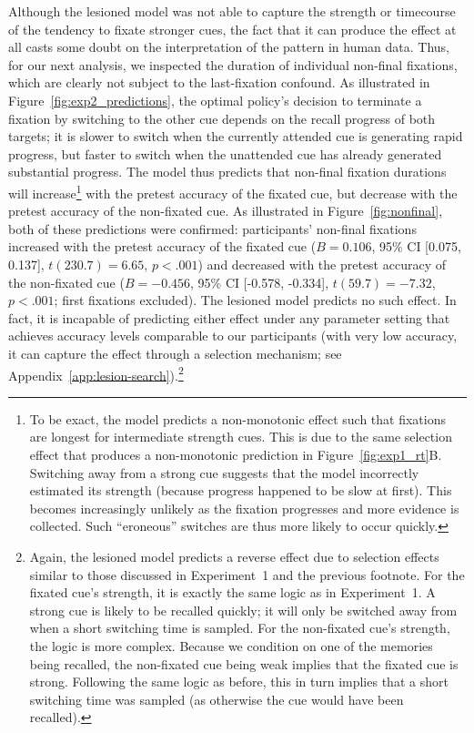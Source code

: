 Although the lesioned model was not able to capture the strength or timecourse of the tendency to fixate stronger cues, the fact that it can produce the effect at all casts some doubt on the interpretation of the pattern in human data. Thus, for our next analysis, we inspected the duration of individual non-final fixations, which are clearly not subject to the last-fixation confound. As illustrated in Figure~\ref{fig:exp2_predictions}, the optimal policy's decision to terminate a fixation by switching to the other cue depends on the recall progress of both targets; it is slower to switch when the currently attended cue is generating rapid progress, but faster to switch when the unattended cue has already generated substantial progress. The model thus predicts that non-final fixation durations will increase\footnote{%
    To be exact, the model predicts a non-monotonic effect such that fixations are longest for intermediate strength cues. This is due to the same selection effect that produces a non-monotonic prediction in Figure~\ref{fig:exp1_rt}B. Switching away from a strong cue suggests that the model incorrectly estimated its strength (because progress happened to be slow at first). This becomes increasingly unlikely as the fixation progresses and more evidence is collected. Such ``eroneous'' switches are thus more likely to occur quickly. 
} with the pretest accuracy of the fixated cue, but decrease with the pretest accuracy of the non-fixated cue. As illustrated in Figure~\ref{fig:nonfinal}, both of these predictions were confirmed: participants' non-final fixations increased with the pretest accuracy of the fixated cue ($B = 0.106$, 95\% CI [0.075, 0.137], $t(230.7)=6.65$, $p < .001$) and decreased with the pretest accuracy of the non-fixated cue ($B = -0.456$, 95\% CI [-0.578, -0.334], $t(59.7)=-7.32$, $p < .001$; first fixations excluded). The lesioned model predicts no such effect. In fact, it is incapable of predicting either effect under any parameter setting that achieves accuracy levels comparable to our participants (with very low accuracy, it can capture the effect through a selection mechanism; see Appendix~\ref{app:lesion-search}).\footnote{
    Again, the lesioned model predicts a reverse effect due to selection effects similar to those discussed in Experiment~1 and the previous footnote. For the fixated cue's strength, it is exactly the same logic as in Experiment~1. A strong cue is likely to be recalled quickly; it will only be switched away from when a short switching time is sampled. For the non-fixated cue's strength, the logic is more complex. Because we condition on one of the memories being recalled, the non-fixated cue being weak implies that the fixated cue is strong. Following the same logic as before, this in turn implies that a short switching time was sampled (as otherwise the cue would have been recalled).
}

